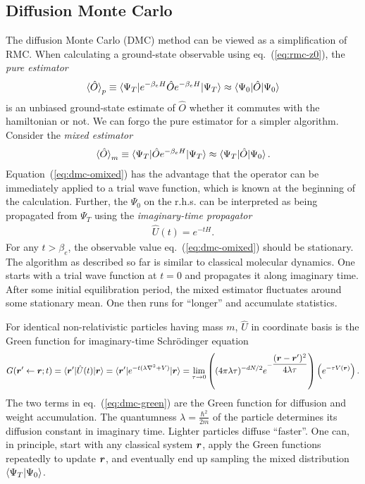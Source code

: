 \subsection{Diffusion Monte Carlo}
The diffusion Monte Carlo (DMC) method can be viewed as a simplification of RMC.
When calculating a ground-state observable using eq.~(\ref{eq:rmc-z0}), the \emph{pure estimator}
\begin{align} \label{eq:dmc-opure}
\braket{\hat{O}}_p \equiv \braket{\Psi_T|e^{-\beta_e H}\hat{O}e^{-\beta_e H}|\Psi_T} \approx \braket{\Psi_0|\hat{O}|\Psi_0}
\end{align}
is an unbiased ground-state estimate of $\hat{O}$ whether it commutes with the hamiltonian or not. We can forgo the pure estimator for a simpler algorithm. Consider the \emph{mixed estimator}
\begin{align} \label{eq:dmc-omixed}
\braket{\hat{O}}_m \equiv \braket{\Psi_T|\hat{O}e^{-\beta_e H}|\Psi_T}\approx\braket{\Psi_T|\hat{O}|\Psi_0}.
\end{align}
Equation~(\ref{eq:dmc-omixed}) has the advantage that the operator can be immediately applied to a trial wave function, which is known at the beginning of the calculation. Further, the $\Psi_0$ on the r.h.s. can be interpreted as being propagated from $\Psi_T$ using the \emph{imaginary-time propagator}
\begin{align}
\hat{U}(t) = e^{-t H}.
\end{align}
For any $t>\beta_e$, the observable value eq.~(\ref{eq:dmc-omixed}) should be stationary. The algorithm as described so far is similar to classical molecular dynamics. One starts with a trial wave function at $t=0$ and propagates it along imaginary time. After some initial equilibration period, the mixed estimator fluctuates around some stationary mean. One then runs for ``longer'' and accumulate statistics.

For identical non-relativistic particles having mass $m$, $\hat{U}$ in coordinate basis is the Green function for imaginary-time Schr\"odinger equation
\begin{align}
G(\boldsymbol{r}'\leftarrow\boldsymbol{r};t) = \braket{\boldsymbol{r}'|\hat{U}(t)|\boldsymbol{r}} =  \braket{\boldsymbol{r}'|e^{-t(\lambda \nabla^2+V)}|\boldsymbol{r}} = \lim\limits_{\tau\rightarrow 0}
\left(
(4\pi\lambda\tau)^{-dN/2}e^{-\dfrac{(\boldsymbol{r}-\boldsymbol{r}')^2}{4\lambda\tau}}
\right)
\left(
e^{-\tau V(\boldsymbol{r})}
\right). \label{eq:dmc-green}
\end{align}
The two terms in eq.~(\ref{eq:dmc-green}) are the Green function for diffusion and weight accumulation.
The quantumness $\lambda=\frac{\hbar^2}{2m}$ of the particle determines its diffusion constant in imaginary time. Lighter particles diffuse ``faster''. One can, in principle, start with any classical system $\boldsymbol{r}$, apply the Green functions repeatedly to update $\boldsymbol{r}$, and eventually end up sampling the mixed distribution $\braket{\Psi_T|\Psi_0}$.

